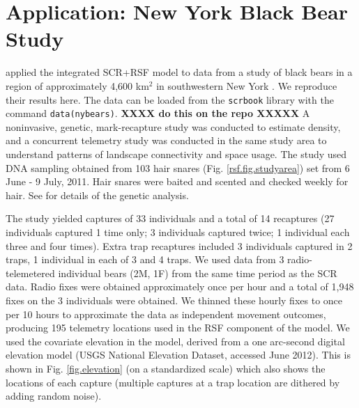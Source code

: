 \section{Application: New York Black Bear Study}
\label{rsf.chapt.nybears}


\citet{royle_etal:2012mee}
applied the integrated SCR+RSF model to data from a study of black bears in a
region of approximately 4,600 km$^2$ in southwestern New York
\citep{sun:2013}. We reproduce their results here.
The data can be loaded from the \mbox{\tt scrbook} library with the
command \mbox{\tt data(nybears)}. {\bf XXXX do this on the repo XXXXX}
A noninvasive, genetic, mark-recapture
study was conducted to estimate density, and a concurrent telemetry
study was conducted in the same study area to understand patterns of
landscape connectivity and space usage.
The study used DNA sampling obtained from 103
hair snares 
(Fig. \ref{rsf.fig.studyarea})
set  from 6 June - 9 July, 2011.
Hair snares
were baited and scented and checked weekly for hair. 
See \citet{sun:2013} for details of the genetic analysis.

The study yielded
captures of 33 individuals and a total of 14 recaptures (27
individuals captured 1 time only; 3 individuals captured twice; 1
individual each three and four times). Extra trap recaptures included
3 individuals captured in 2 traps, 1 individual in each of 3 and 4
traps.  We used data from 3 radio-telemetered individual bears (2M,
1F) from the same time period as the SCR data. Radio fixes were
obtained approximately once per hour and a total of 1,948 fixes on the
3 individuals were obtained. We thinned these hourly fixes to once per
10 hours to approximate the data as independent movement outcomes,
producing 195 telemetry locations used in the RSF component of the
model.  We used the covariate elevation in the model, derived from a
one arc-second digital elevation model (USGS National Elevation
Dataset, accessed June 2012).  This is shown in
Fig. \ref{fig.elevation} (on a
standardized scale) which also shows the locations of each capture
(multiple captures at a trap location are dithered by adding random
noise).


